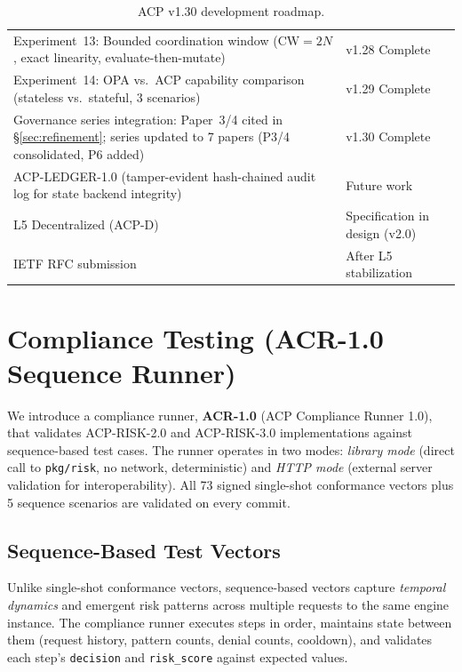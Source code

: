 \documentclass[11pt]{article}
\theoremstyle{definition}
\begin{document}
\begin{table}[h!]
\begin{tabular}{@{}p{9.5cm}l@{}}
Experiment~13: Bounded coordination window ($\mathrm{CW}=2N$, exact linearity, evaluate-then-mutate) & v1.28 Complete \\
Experiment~14: OPA vs.\ ACP capability comparison (stateless vs.\ stateful, 3 scenarios) & v1.29 Complete \\
Governance series integration: Paper~3/4 cited in \S\ref{sec:refinement}; series updated to 7 papers (P3/4 consolidated, P6 added) & v1.30 Complete \\
ACP-LEDGER-1.0 (tamper-evident hash-chained audit log for state backend integrity) & Future work \\
L5 Decentralized (ACP-D) & Specification in design (v2.0) \\
IETF RFC submission & After L5 stabilization \\
\bottomrule
\end{tabular}
\caption{ACP v1.30 development roadmap.}
\label{tab:roadmap}
\end{table}

\section{Compliance Testing (ACR-1.0 Sequence Runner)}
\label{sec:compliance-testing}

We introduce a compliance runner, \textbf{ACR-1.0} (ACP Compliance Runner 1.0), that validates ACP-RISK-2.0 and ACP-RISK-3.0 implementations
against sequence-based test cases.
The runner operates in two modes: \emph{library mode} (direct call to \texttt{pkg/risk},
no network, deterministic) and \emph{HTTP mode} (external server validation for interoperability).
All 73 signed single-shot conformance vectors plus 5 sequence scenarios
are validated on every commit.

\subsection{Sequence-Based Test Vectors}

Unlike single-shot conformance vectors, sequence-based vectors capture \emph{temporal dynamics}
and emergent risk patterns across multiple requests to the same engine instance.
The compliance runner executes steps in order, maintains state between them
(request history, pattern counts, denial counts, cooldown),
and validates each step's \texttt{decision} and \texttt{risk\_score} against expected values.
\end{document}
